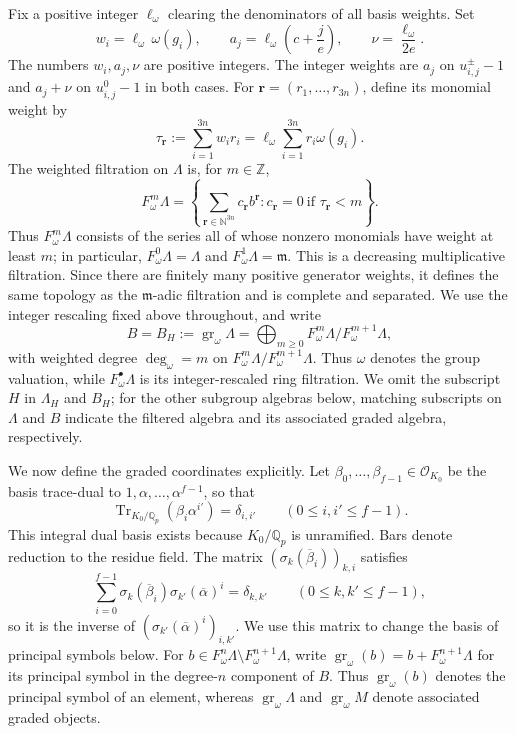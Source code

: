 \documentclass[11pt]{article}
\numberwithin{equation}{section}
\theoremstyle{definition}
\theoremstyle{remark}
\newcommand{\Q}{\mathbb Q}
\newcommand{\Z}{\mathbb Z}
\newcommand{\N}{\mathbb N}
\newcommand{\cO}{\mathcal O}
\newcommand{\fm}{\mathfrak m}
\DeclareMathOperator{\gr}{gr}
\begin{document}
Fix a positive integer $\ell_\omega$ clearing the denominators of all
basis weights.
Set
\[
 w_i=\ell_\omega\,\omega(g_i),\qquad
 a_j=\ell_\omega\left(c+\frac je\right),\qquad
 \nu=\frac{\ell_\omega}{2e}.
\]
The numbers $w_i,a_j,\nu$ are positive integers. The integer
weights are $a_j$ on $u^\pm_{i,j}-1$ and $a_j+\nu$ on
$u^0_{i,j}-1$ in both cases.
For $\mathbf r=(r_1,\ldots,r_{3n})$, define its monomial weight by
\[
 \tau_{\mathbf r}:=\sum_{i=1}^{3n}w_i r_i
     =\ell_\omega\sum_{i=1}^{3n}r_i\omega(g_i).
\]
The weighted filtration on $\Lambda$ is, for $m\in\Z$,
\begin{equation}\label{eq:weighted-ring-filtration}
 F_\omega^m\Lambda=
 \left\{\sum_{\mathbf r\in\N^{3n}}c_{\mathbf r}b^{\mathbf r}:
 c_{\mathbf r}=0\ \text{if }\tau_{\mathbf r}<m\right\}.
\end{equation}
Thus $F_\omega^m\Lambda$ consists of the series all of whose nonzero
monomials have weight at least $m$; in particular,
$F_\omega^0\Lambda=\Lambda$ and $F_\omega^1\Lambda=\fm$.
This is a decreasing multiplicative filtration. Since there are
finitely many positive generator weights, it defines the same
topology as the $\fm$-adic filtration and is complete and separated.
We use the integer rescaling fixed above throughout, and write
\[
 B=B_H:=\gr_\omega\Lambda
   =\bigoplus_{m\geq0}F_\omega^m\Lambda/F_\omega^{m+1}\Lambda,
\]
with weighted degree $\deg_\omega=m$ on
$F_\omega^m\Lambda/F_\omega^{m+1}\Lambda$. Thus $\omega$ denotes
the group valuation, while $F_\omega^\bullet\Lambda$ is its
integer-rescaled ring filtration. We omit the subscript $H$ in
$\Lambda_H$ and $B_H$; for the other subgroup algebras below,
matching subscripts on $\Lambda$ and $B$ indicate the filtered
algebra and its associated graded algebra, respectively.

We now define the graded coordinates explicitly.
Let $\beta_0,\ldots,\beta_{f-1}\in\cO_{K_0}$ be the basis
trace-dual to $1,\alpha,\ldots,\alpha^{f-1}$, so that
\[
 \operatorname{Tr}_{K_0/\Q_p}(\beta_i\alpha^{i'})=\delta_{i,i'}
 \qquad(0\leq i,i'\leq f-1).
\]
This integral dual basis exists because $K_0/\Q_p$ is unramified.
Bars denote reduction to the residue field. The matrix
$(\sigma_k(\overline\beta_i))_{k,i}$ satisfies
\[
 \sum_{i=0}^{f-1}\sigma_k(\overline\beta_i)
                     \sigma_{k'}(\overline\alpha)^i
     =\delta_{k,k'}\qquad(0\leq k,k'\leq f-1),
\]
so it is the inverse of $(\sigma_{k'}(\overline\alpha)^i)_{i,k'}$.
We use this matrix to change the basis of principal symbols below.
For $b\in F_\omega^n\Lambda\setminus F_\omega^{n+1}\Lambda$, write
$\gr_\omega(b)=b+F_\omega^{n+1}\Lambda$ for its principal symbol
in the degree-$n$ component of $B$. Thus $\gr_\omega(b)$ denotes
the principal symbol of an element, whereas $\gr_\omega\Lambda$
and $\gr_\omega M$ denote associated graded objects.
\end{document}

